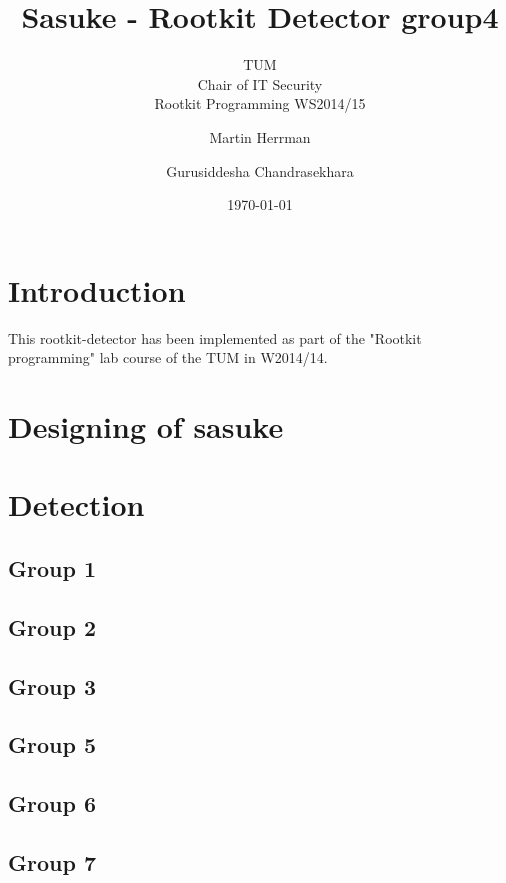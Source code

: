 \documentclass[10pt, letterpaper]{scrartcl}
\title{Sasuke - Rootkit Detector group4}
\subtitle{TUM \\Chair of IT Security\\  Rootkit Programming WS2014/15}
\author{Martin Herrman \and Gurusiddesha Chandrasekhara}
\date{\today}
\begin{document}
\maketitle
\tableofcontents
\newpage

\section{Introduction}
This rootkit-detector has been implemented as part of the "Rootkit programming" lab course of the TUM in W2014/14. 

\section{Designing of sasuke}

\section{Detection}

\subsection{Group 1}
\subsection{Group 2}
\subsection{Group 3}
\subsection{Group 5}
\subsection{Group 6}
\subsection{Group 7}
\end{document}
